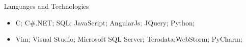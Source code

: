 \documentclass[]{mcdowellcv}
\begin{document}
	\begin{cvsection}{Languages and Technologies}
		\begin{cvsubsection}{}{}{}	
			\begin{itemize}
				\item C; C\#.NET; SQL; JavaScript; AngularJs; JQuery; Python;  
				\item Vim; Visual Studio; Microsoft SQL Server; Teradata;WebStorm; PyCharm;
			\end{itemize}
		\end{cvsubsection}
	\end{cvsection}
\end{document}
